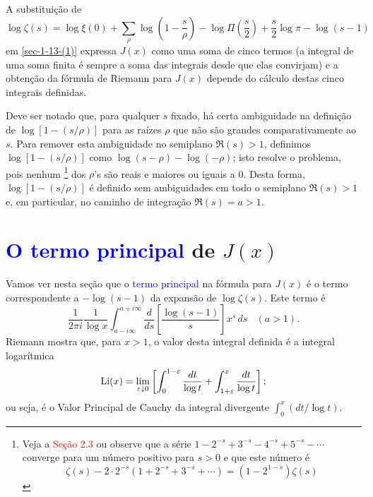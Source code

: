     A substituição de 
    \begin{equation*}
        \log \zeta(s) = \log \xi(0) + \sum_{\rho} \log \left( 1 - \frac{s}{\rho} \right) - \log \Pi \left( \frac{s}{2} \right) + \frac{s}{2} \log \pi - \log (s-1)
    \end{equation*}
    em \eqref{sec-1-13-(1)} expressa $J(x)$ como uma soma de cinco termos (a integral de uma soma finita é sempre a soma das integrais desde que elas convirjam) e a obtenção da fórmula de Riemann para $J(x)$ depende do cálculo destas cinco integrais definidas.
    
    Deve ser notado que, para qualquer $s$ fixado, há certa ambiguidade na definição de $\log [1 - (s/\rho)]$ para as raízes $\rho$ que não são grandes comparativamente ao $s$. Para remover esta ambiguidade no semiplano $\Re(s) > 1$, definimos $\log [1 - (s/\rho)]$ como $\log (s - \rho) - \log (-\rho)$; isto resolve o problema, pois nenhum
    \footnote{Veja a \textcolor{red}{Seção 2.3} ou observe que a série $1 - 2^{-s} + 3^{-s} - 4^{-s} + 5^{-s} - \cdots$ converge para um número positivo para $s>0$ e que este número é 
    \begin{equation*}
        \zeta(s) - 2 \cdot 2^{-s} ( 1 + 2^{-s} + 3^{-s} + \cdots) = (1 - 2^{1 - s})\zeta(s)
    \end{equation*}
    }
    dos $\rho$'s são reais e maiores ou iguais a 0. Desta forma, $\log [1 - (s/\rho)]$ é definido sem ambiguidades em todo o semiplano $\Re(s) > 1$ e, em particular, no caminho de integração $\Re(s) = a > 1$.

    
    \section{\textcolor{blue}{O termo principal} de $J(x)$} \label{sec-1-14}
    
    
    Vamos ver nesta seção que \textcolor{blue}{o termo principal} na fórmula para $J(x)$ é o termo correspondente a $-\log(s-1)$ da expansão de $\log \zeta(s)$. Este termo é
    \begin{equation*}
        \frac{1}{2\pi i} \frac{1}{\log x} \int_{a - i\infty}^{a + i\infty} \frac{d}{ds} \left[ \frac{\log(s-1)}{s} \right] x^s \, ds \ \ \ \ (a>1).
    \end{equation*}
    Riemann mostra que, para $x > 1$, o valor desta integral definida é a integral logarítmica
    \begin{equation*}
         \text{Li}(x) = \lim_{\varepsilon \downarrow 0} \left[ \int_{0}^{1 - \varepsilon} \frac{dt}{\log t} + \int_{1 + \varepsilon}^{x} \frac{dt}{\log t}\right];
    \end{equation*}
    ou seja, é o Valor Principal de Cauchy da integral divergente $\int_{0}^{x}(dt/\log t)$. 
    
